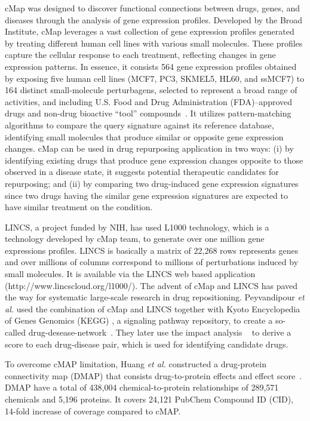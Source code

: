 \documentclass[Minh_PhD_thesis.tex]{subfiles}
\begin{document}
cMap was designed to discover functional connections between drugs, genes, and diseases through the analysis of gene expression profiles. Developed by the Broad Institute, cMap leverages a vast collection of gene expression profiles generated by treating different human cell lines with various small molecules. These profiles capture the cellular response to each treatment, reflecting changes in gene expression patterns.
In essence, it consists 564 gene expression profiles obtained by exposing five human cell lines (MCF7, PC3, SKMEL5, HL60, and ssMCF7) to 164 distinct small-molecule perturbagens, selected to represent a broad range of activities, and including U.S. Food and Drug Administration (FDA)–approved drugs and non-drug bioactive “tool” compounds~\cite{lamb2006connectivity}. 
It utilizes pattern-matching algorithms to compare the query signature against its reference database, identifying small molecules that produce similar or opposite gene expression changes.
cMap can be used in drug repurposing application in two ways: (i) by identifying existing drugs that produce gene expression changes opposite to those observed in a disease state, it suggests potential therapeutic candidates for repurposing; and (ii) by comparing two drug-induced gene expression signatures since two drugs having the similar gene expression signatures are expected to have similar treatment on the condition.

LINCS, a project funded by NIH, has used L1000 technology, which is a technology developed by cMap team, to generate over one million gene expressions profiles. LINCS is basically a matrix of 22,268 rows represents genes and over millions of columns correspond to millions of perturbations induced by small molecules. It is available via the LINCS web based application (http://www.lincscloud.org/l1000/). The advent of cMap and LINCS has paved the way for systematic large-scale research in drug repositioning.  Peyvandipour \textit{et al.} used the combination of cMap and LINCS together with Kyoto Encyclopedia of Genes Genomics (KEGG) \cite{ogata1999kegg}, a signaling pathway repository, to create a so-called drug-desease-network~\cite{peyvandipour2018novel}. They later use the impact analysis ~\cite{draghici2007systems} to derive a score to each drug-disease pair, which is used for identifying candidate drugs.

To overcome cMAP limitation, Huang \textit{et al.} constructed a drug-protein connectivity map (DMAP) that consists drug-to-protein effects and effect score~\cite{huang2015dmap}. DMAP have a total of 438,004 chemical-to-protein relationships of 289,571 chemicals and 5,196 proteins. It covers 24,121 PubChem Compound ID (CID), 14-fold increase of coverage compared to cMAP. 
\end{document}
